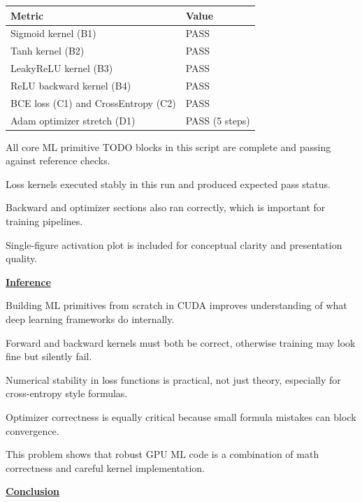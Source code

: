 \documentclass[12pt]{article}
\begin{document}
\begin{center}
\begin{tabular}{|p{7cm}|p{5cm}|}
\hline
\textbf{Metric} & \textbf{Value} \\
\hline
Sigmoid kernel (B1) & PASS \\
\hline
Tanh kernel (B2) & PASS \\
\hline
LeakyReLU kernel (B3) & PASS \\
\hline
ReLU backward kernel (B4) & PASS \\
\hline
BCE loss (C1) and CrossEntropy (C2) & PASS \\
\hline
Adam optimizer stretch (D1) & PASS (5 steps) \\
\hline
\end{tabular}
\end{center}

All core ML primitive TODO blocks in this script are complete and passing against reference checks.

Loss kernels executed stably in this run and produced expected pass status.

Backward and optimizer sections also ran correctly, which is important for training pipelines.

Single-figure activation plot is included for conceptual clarity and presentation quality.

\vspace{0.8cm}

\textbf{\Large \underline{Inference}}

\vspace{0.5cm}

Building ML primitives from scratch in CUDA improves understanding of what deep learning frameworks do internally.

Forward and backward kernels must both be correct, otherwise training may look fine but silently fail.

Numerical stability in loss functions is practical, not just theory, especially for cross-entropy style formulas.

Optimizer correctness is equally critical because small formula mistakes can block convergence.

This problem shows that robust GPU ML code is a combination of math correctness and careful kernel implementation.

\vspace{0.8cm}

\textbf{\Large \underline{Conclusion}}

\vspace{0.5cm}
\end{document}
